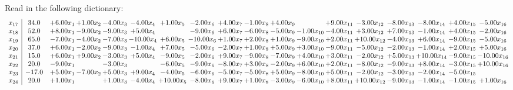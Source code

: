 \documentclass[9pt]{article}
\begin{document}
Read in the following dictionary:
\[\begin{array}{c| c c@{\hskip 2pt} c@{\hskip 2pt} c@{\hskip 2pt} c@{\hskip 2pt} c@{\hskip 2pt} c@{\hskip 2pt} c@{\hskip 2pt} c@{\hskip 2pt} c@{\hskip 2pt} c@{\hskip 2pt} c@{\hskip 2pt} c@{\hskip 2pt} c@{\hskip 2pt} c@{\hskip 2pt} c@{\hskip 2pt} c@{\hskip 2pt} }
 x_{17}   &  34.0 & +  6.00 x_{1} & +  1.00 x_{2} & -4.00 x_{3} & -4.00 x_{4} & +  1.00 x_{5} & -2.00 x_{6} & +  4.00 x_{7} & -1.00 x_{8} & +  4.00 x_{9} &   & +  9.00 x_{11} & -3.00 x_{12} & -8.00 x_{13} & -8.00 x_{14} & +  4.00 x_{15} & -5.00 x_{16}\\
 x_{18}   &  52.0 & +  8.00 x_{1} & -9.00 x_{2} & -9.00 x_{3} & +  5.00 x_{4} &   & -9.00 x_{6} & +  6.00 x_{7} & -6.00 x_{8} & -5.00 x_{9} & -1.00 x_{10} & -4.00 x_{11} & +  3.00 x_{12} & +  7.00 x_{13} & -1.00 x_{14} & +  4.00 x_{15} & -2.00 x_{16}\\
 x_{19}   &  65.0 & -7.00 x_{1} & -4.00 x_{2} & -7.00 x_{3} & -10.00 x_{4} & +  6.00 x_{5} & -10.00 x_{6} & +  1.00 x_{7} & +  2.00 x_{8} & +  1.00 x_{9} & -9.00 x_{10} & +  2.00 x_{11} & + 10.00 x_{12} & -4.00 x_{13} & +  6.00 x_{14} & -9.00 x_{15} & -5.00 x_{16}\\
 x_{20}   &  37.0 & +  6.00 x_{1} & -2.00 x_{2} & -9.00 x_{3} & -1.00 x_{4} & +  7.00 x_{5} & -5.00 x_{6} & -2.00 x_{7} & +  1.00 x_{8} & +  5.00 x_{9} & +  3.00 x_{10} & -9.00 x_{11} & -5.00 x_{12} & -2.00 x_{13} & -1.00 x_{14} & +  2.00 x_{15} & +  5.00 x_{16}\\
 x_{21}   &  15.0 & +  6.00 x_{1} & +  9.00 x_{2} & -3.00 x_{3} & +  5.00 x_{4} & -9.00 x_{5} & -2.00 x_{6} & +  9.00 x_{7} & -9.00 x_{8} & -7.00 x_{9} & +  4.00 x_{10} & +  3.00 x_{11} & -2.00 x_{12} & +  5.00 x_{13} & + 10.00 x_{14} & -9.00 x_{15} & -10.00 x_{16}\\
 x_{22}   &  20.0 & -9.00 x_{1} &   & -3.00 x_{3} &   & -6.00 x_{5} & -9.00 x_{6} & -8.00 x_{7} & +  3.00 x_{8} & -2.00 x_{9} & +  6.00 x_{10} & +  2.00 x_{11} & -8.00 x_{12} & -9.00 x_{13} & +  8.00 x_{14} & -3.00 x_{15} & + 10.00 x_{16}\\
 x_{23}   &  -17.0 & +  5.00 x_{1} & -7.00 x_{2} & +  5.00 x_{3} & +  9.00 x_{4} & -4.00 x_{5} & -6.00 x_{6} & -5.00 x_{7} & -5.00 x_{8} & +  5.00 x_{9} & -8.00 x_{10} & +  5.00 x_{11} & -2.00 x_{12} & -3.00 x_{13} & -2.00 x_{14} & -5.00 x_{15} &   \\
 x_{24}   &  20.0 & +  1.00 x_{1} &   & +  1.00 x_{3} & -4.00 x_{4} & + 10.00 x_{5} & -8.00 x_{6} & +  9.00 x_{7} & +  1.00 x_{8} & -3.00 x_{9} & -6.00 x_{10} & +  8.00 x_{11} & + 10.00 x_{12} & -9.00 x_{13} & -1.00 x_{14} & -1.00 x_{15} & +  1.00 x_{16}\\

\end{array}\]
\end{document}
